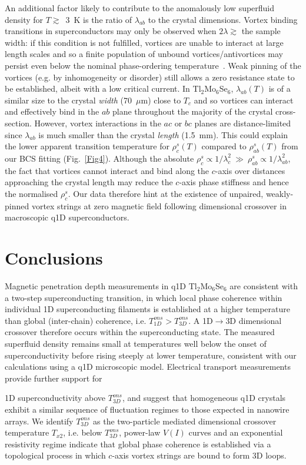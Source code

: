 \documentclass[prb,twocolumn,showpacs,preprintnumbers,amsmath,amssymb,floatfix,groupedaddress,superscriptaddress,aps,10pt]{revtex4-1}
\newcommand{\Tl}{Tl$_2$Mo$_6$Se$_6$}
\begin{document}
{An additional factor likely to contribute to the anomalously low superfluid density for $T\gtrsim$~3~K is the ratio of $\lambda_{ab}$ to the crystal dimensions. Vortex binding transitions in superconductors may only be observed when $2\lambda\gtrsim$ the sample width: if this condition is not fulfilled, vortices are unable to interact at large length scales and so a finite population of unbound vortices/antivortices may persist even below the nominal phase-ordering temperature~\cite{Holzer2001}.  Weak pinning of the vortices (e.g. by inhomogeneity or disorder) still allows a zero resistance state to be established, albeit with a low critical current.  In {\Tl}, $\lambda_{ab}(T)$ is of a similar size to the crystal \emph{width} (70~$\mu$m) close to $T_c$ and so vortices can interact and effectively bind in the $ab$ plane throughout the majority of the crystal cross-section. However, vortex interactions in the $ac$ or $bc$ planes are distance-limited since $\lambda_{ab}$ is much smaller than the crystal \emph{length} (1.5~mm).  This could explain the lower apparent transition temperature for $\rho^s_c(T)$ compared to $\rho^s_{ab}(T)$ from our BCS fitting (Fig.~\ref{Fig4}).  Although the absolute $\rho^s_c\propto1/\lambda_c^2~\gg~\rho^s_{ab}\propto1/\lambda_{ab}^2$, the fact that vortices cannot interact and bind along the $c$-axis over distances approaching the crystal length may reduce the $c$-axis phase stiffness and hence the normalised $\rho^s_c$.  Our data therefore hint at the existence of unpaired, weakly-pinned vortex strings at zero magnetic field following dimensional crossover in macroscopic q1D superconductors.  

\section{Conclusions}

Magnetic penetration depth measurements in q1D {\Tl} are consistent with a two-step superconducting transition, in which local phase coherence within individual 1D superconducting filaments is established at a higher temperature than global (inter-chain) coherence, i.e. $T_{1D}^{ons}>T_{3D}^{ons}$.  A 1D$\rightarrow$3D dimensional crossover therefore occurs within the superconducting state. The measured superfluid density remains small at temperatures well below the onset of superconductivity before rising steeply at lower temperature, consistent with our calculations using a q1D microscopic model.  Electrical transport measurements provide further support for {1D superconductivity above $T_{3D}^{ons}$, and suggest that homogeneous q1D crystals exhibit a similar sequence of fluctuation regimes to those expected in nanowire arrays.  We identify $T_{3D}^{ons}$ as the two-particle mediated dimensional crossover temperature $T_{x2}$, i.e. below $T_{3D}^{ons}$, power-law $V(I)$ curves and an exponential resistivity regime indicate that global phase coherence is established via a topological process in which $c$-axis vortex strings are bound to form 3D loops.  

}}
\end{document}
